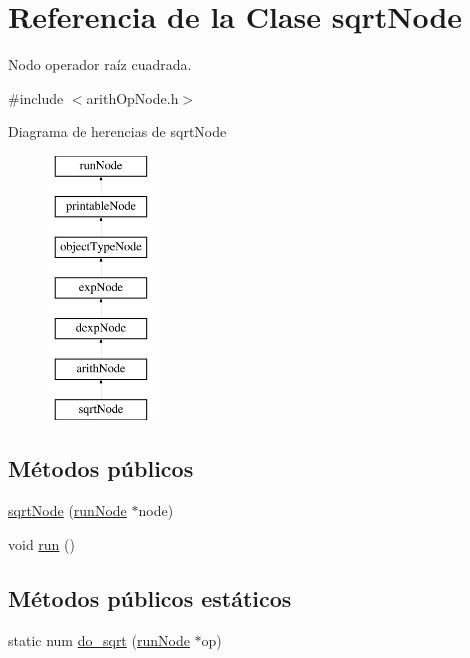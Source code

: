 \hypertarget{classsqrtNode}{\section{Referencia de la Clase sqrt\-Node}
\label{classsqrtNode}
}


Nodo operador raíz cuadrada.  




{\ttfamily \#include $<$arith\-Op\-Node.\-h$>$}

Diagrama de herencias de sqrt\-Node\begin{figure}[H]
\begin{center}
\leavevmode
\includegraphics[height=7.000000cm]{classsqrtNode}
\end{center}
\end{figure}
\subsection*{Métodos públicos}
\begin{DoxyCompactItemize}
\item 
\hyperlink{classsqrtNode_a8738304359591e6a27eba7df51f32308}{sqrt\-Node} (\hyperlink{classrunNode}{run\-Node} $\ast$node)
\item 
void \hyperlink{classsqrtNode_ad506515cfee088421b7eefcd93b14d78}{run} ()
\end{DoxyCompactItemize}
\subsection*{Métodos públicos estáticos}
\begin{DoxyCompactItemize}
\item 
static num \hyperlink{classsqrtNode_ace2588ca9766adc815ca5b8e6c52187d}{do\-\_\-sqrt} (\hyperlink{classrunNode}{run\-Node} $\ast$op)
\end{DoxyCompactItemize}
